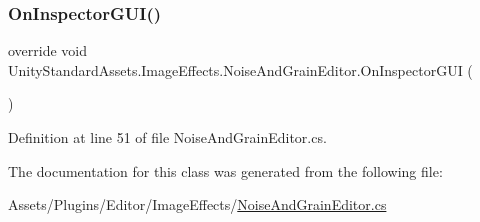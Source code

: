 \subsubsection{\texorpdfstring{On\+Inspector\+G\+U\+I()}{OnInspectorGUI()}}
{\footnotesize\ttfamily override void Unity\+Standard\+Assets.\+Image\+Effects.\+Noise\+And\+Grain\+Editor.\+On\+Inspector\+G\+UI (\begin{DoxyParamCaption}{ }\end{DoxyParamCaption})}



Definition at line 51 of file Noise\+And\+Grain\+Editor.\+cs.



The documentation for this class was generated from the following file\+:\begin{DoxyCompactItemize}
\item 
Assets/\+Plugins/\+Editor/\+Image\+Effects/\mbox{\hyperlink{_noise_and_grain_editor_8cs}{Noise\+And\+Grain\+Editor.\+cs}}\end{DoxyCompactItemize}
